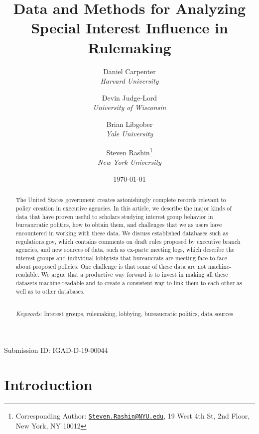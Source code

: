 \documentclass[
      12pt,
        ]{article}
\title{Data and Methods for Analyzing Special Interest Influence in Rulemaking}
\author{ %
            Daniel Carpenter  \\ \emph{Harvard University} 
             \and 
            Devin Judge-Lord  \\ \emph{University of Wisconsin} 
             \and 
            Brian Libgober  \\ \emph{Yale University} 
             \and 
            Steven Rashin\footnote{Corresponding Author:
\href{mailto:Steven.Rashin@NYU.edu}{\nolinkurl{Steven.Rashin@NYU.edu}},
19 West 4th St, 2nd Floor, New York, NY 10012}  \\ \emph{New York University} 
            }
\date{\today}
\begin{document}
 


  \maketitle




  \begin{abstract}
    \noindent The United States government creates astonishingly complete records
relevant to policy creation in executive agencies. In this article, we
describe the major kinds of data that have proven useful to scholars
studying interest group behavior in bureaucratic politics, how to obtain
them, and challenges that we as users have encountered in working with
these data. We discuss established databases such as regulations.gov,
which contains comments on draft rules proposed by executive branch
agencies, and new sources of data, such as ex-parte meeting logs, which
describe the interest groups and individual lobbyists that bureaucrats
are meeting face-to-face about proposed policies. One challenge is that
some of these data are not machine-readable. We argue that a productive
way forward is to invest in making all these datasets machine-readable
and to create a consistent way to link them to each other as well as to
other databases. 

          \hfill \\ 
      \noindent \emph{Keywords}: Interest groups, rulemaking, lobbying, bureaucratic politics, data
sources 
    
  \end{abstract}









  \newpage

\noindent 
      \doublespacing 
    \noindent Submission ID: IGAD-D-19-00044

\hypertarget{introduction}{%
\section{Introduction}\label{introduction}}
\end{document}
